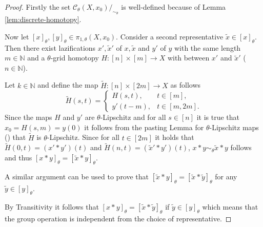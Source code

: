 \documentclass[a4paper, 11pt, twoside]{article}
\newcommand{\N}[0]{\mathbb{N}}
\theoremstyle{break}
\theoremstyle{break}
\begin{document}
\begin{proof}
  Firstly the set $\mathcal{C}_{\theta}(X, x_0)/_{\sim_{\theta}}$ is well-defined because of Lemma \ref{lem:discrete-homotopy}.

  Now let $[x]_{\theta}, [y]_{\theta} \in \pi_{1, \theta}(X, x_0)$. Consider a second representative $\tilde{x} \in [x]_{\theta}$.
  Then there exist lazifications $x', \tilde{x}'$ of $x, \tilde{x}$ and $y'$ of $y$ with the same length $m \in \N$ 
  and a $\theta$-grid homotopy $H\colon [n] \times [m] \to X$ with between $x'$ and $\tilde{x}'$ ($n \in \N$).

  Let $k \in \N$ and define the map $\tilde{H}\colon [n] \times [2m] \to X$ as follows
  \begin{equation*}
    \tilde{H}(s, t) = \begin{cases}
       H(s, t), &t \in [m], \\
       y'(t-m), &t \in [m,2m].
    \end{cases}
  \end{equation*}
  Since the maps $H$ and $y'$ are $\theta$-Lipschitz and for all $s \in [n]$ it is true that $x_0 = H(s,m) = y(0)$ 
  it follows from the pasting Lemma for $\theta$-Lipschitz maps (\cite[Thm. 1]{kvalheim2021pasting}) that $\tilde{H}$ is $\theta$-Lipschitz.
  Since for all $t \in [2m]$ it holds that $\tilde{H}(0, t) = (x' * y')(t)$ and $\tilde{H}(n, t) = (\tilde{x}' * y')(t)$,
  $x * y \sim_{\theta} \tilde{x} * y$ follows and thus $[x * y]_{\theta} = [\tilde{x} * y]_\theta$.

  A similar argument can be used to prove that $[\tilde{x} * y]_{\theta} = [\tilde{x} * \tilde{y}]_{\theta}$ for any $\tilde{y} \in [y]_{\theta}$.   
  
  By Transitivity it follows that $[x * y]_{\theta} = [\tilde{x} * \tilde{y}]_{\theta}$ if $\tilde{y} \in [y]_\theta$ 
  which means that the group operation is independent from the choice of representative.


\end{proof}
\end{document}
